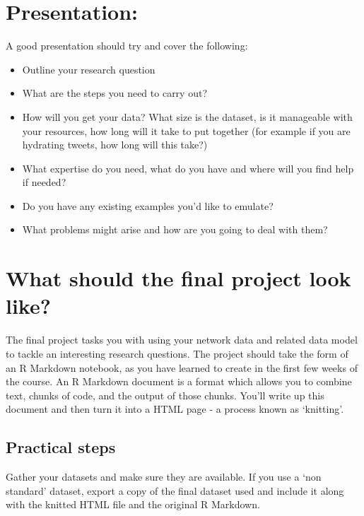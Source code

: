 \documentclass[
]{book}
\begin{document}
\hypertarget{presentation}{%
\section{Presentation:}\label{presentation}}

A good presentation should try and cover the following:

\begin{itemize}
\item
  Outline your research question
\item
  What are the steps you need to carry out?
\item
  How will you get your data? What size is the dataset, is it manageable with your resources, how long will it take to put together (for example if you are hydrating tweets, how long will this take?)
\item
  What expertise do you need, what do you have and where will you find help if needed?
\item
  Do you have any existing examples you'd like to emulate?
\item
  What problems might arise and how are you going to deal with them?
\end{itemize}

\hypertarget{what-should-the-final-project-look-like}{%
\section{What should the final project look like?}\label{what-should-the-final-project-look-like}}

The final project tasks you with using your network data and related data model to tackle an interesting research questions. The project should take the form of an R Markdown notebook, as you have learned to create in the first few weeks of the course. An R Markdown document is a format which allows you to combine text, chunks of code, and the output of those chunks. You'll write up this document and then turn it into a HTML page - a process known as `knitting'.

\hypertarget{practical-steps}{%
\subsection{Practical steps}\label{practical-steps}}

Gather your datasets and make sure they are available. If you use a `non standard' dataset, export a copy of the final dataset used and include it along with the knitted HTML file and the original R Markdown.
\end{document}
